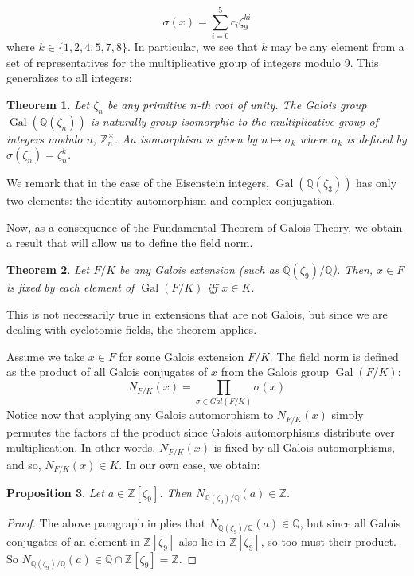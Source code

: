 \documentclass[12pt]{amsart}
\newtheorem{theorem}{Theorem}[section]
\newtheorem{proposition}[theorem]{Proposition}
\theoremstyle{definition}
\newcommand{\Z}{\mathbb{Z}}
\newcommand{\Q}{\mathbb{Q}}
\DeclareMathOperator{\Gal}{Gal} %
\newcommand{\Zn}{\mathbb{Z}[\zeta_9]}
\begin{document}
	$$
		\sigma(x) = \sum_{i=0}^5 c_i \zeta_9^{ki}
	$$  
	where $k \in \{1,2,4,5,7,8\}$. In particular, we see that $k$ may be any element from a set of representatives for the multiplicative group of integers modulo 9. This generalizes to all integers:
	
	\begin{theorem}\label{T:3:3}
		Let $\zeta_n$ be any primitive $n$-th root of unity. The Galois group $\Gal(\Q(\zeta_n))$ is naturally group isomorphic to the multiplicative group of integers modulo $n$, $\mathbb{Z}_n^{\times}$. An isomorphism is given by $n \longmapsto \sigma_k$ where $\sigma_k$ is defined by $\sigma(\zeta_n) = \zeta_n^k$.
	\end{theorem}
	We remark that in the case of the Eisenstein integers, $\Gal(\Q(\zeta_3))$ has only two elements: the identity automorphism and complex conjugation.
	
	Now, as a consequence of the Fundamental Theorem of Galois Theory, we obtain a result that will allow us to define the field norm.
	
	\begin{theorem}\label{T:3:4}
		Let $F/K$ be any Galois extension (such as $\Q(\zeta_9)/\Q$). Then, $x \in F$ is fixed by each element of $\Gal(F/K)$ iff $x \in K$.
	\end{theorem}
	
	This is not necessarily true in extensions that are not Galois, but since we are dealing with cyclotomic fields, the theorem applies. 
	
	Assume we take $x \in F$ for some Galois extension $F/K$. The field norm is defined as the product of all Galois conjugates of $x$ from the Galois group $\Gal(F/K)$:
	$$
	N_{F/K}(x) = \prod_{\sigma \in Gal(F/K)} \sigma(x)
	$$
	Notice now that applying any Galois automorphism to $N_{F/K}(x)$ simply permutes the factors of the product since Galois automorphisms distribute over multiplication. In other words, $N_{F/K}(x)$ is fixed by all Galois automorphisms, and so, $N_{F/K}(x) \in K$. In our own case, we obtain:
	
	\begin{proposition}\label{P:3:5}
		Let $a \in \Zn$. Then $N_{\Q(\zeta_9)/\Q}(a) \in \Z$. 
	\end{proposition}
	
	\begin{proof}
		The above paragraph implies that $N_{\Q(\zeta_9)/\Q}(a) \in \Q$, but since all Galois conjugates of an element in $\Zn$ also lie in $\Zn$, so too must their product. So $N_{\Q(\zeta_9)/\Q}(a) \in \Q\cap \Zn = \Z$. 
	\end{proof}
	
\end{document}
